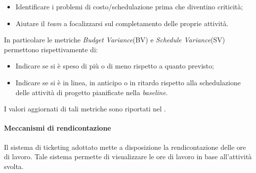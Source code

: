 		\begin{itemize}
			\item Identificare i problemi di costo/schedulazione prima che diventino criticità;
			\item Aiutare il \textit{team} a focalizzarsi sul completamento delle proprie attività.
		\end{itemize}
		In particolare le metriche \textit{Budget Variance}(BV) e \textit{Schedule Variance}(SV) permettono rispettivamente di:
		\begin{itemize}
			\item Indicare se si è speso di più o di meno rispetto a quanto previsto;
			\item Indicare se si è in linea, in anticipo o in ritardo rispetto alla schedulazione delle	attività di progetto pianificate nella \textit{baseline}.
		\end{itemize}
		I valori aggiornati di tali metriche sono riportati nel \textit{\PdQ}.
	\paragraph{Meccanismi di rendicontazione} Il sistema di ticketing adottato mette a disposizione la rendicontazione delle ore di lavoro. Tale sistema permette di visualizzare le ore di lavoro in base all'attività svolta.
